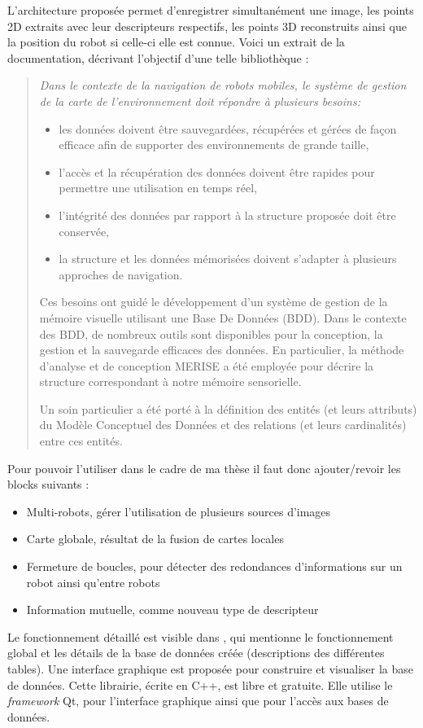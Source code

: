 L'architecture proposée permet d'enregistrer simultanément une image, les points 2D extraits avec leur descripteurs respectifs, les points 3D reconstruits ainsi que la position du robot si celle-ci elle est connue.
Voici un extrait de la documentation, décrivant l'objectif d'une telle bibliothèque :
\begin{quote}
\it Dans le contexte de la navigation de robots mobiles, le système de gestion de la carte de l'environnement doit répondre à plusieurs besoins:
\begin{itemize}
\item les données doivent être sauvegardées, récupérées et gérées de façon efficace afin de supporter des environnements de grande taille,
\item l'accès et la récupération des données doivent être rapides pour permettre une utilisation en temps réel,
\item l'intégrité des données par rapport à la structure proposée doit être conservée,
\item la structure et les données mémorisées doivent s'adapter à plusieurs approches de navigation.
\end{itemize}

Ces besoins ont guidé le développement d'un système de gestion de la mémoire visuelle utilisant une Base De Données (BDD). Dans le contexte des BDD, de nombreux outils sont disponibles pour la conception, la gestion et la sauvegarde efficaces des données. En particulier, la méthode d'analyse et de conception MERISE a été employée pour décrire la structure correspondant à notre mémoire sensorielle.

Un soin particulier a été porté à la définition des entités (et leurs attributs) du Modèle Conceptuel des Données et des relations (et leurs cardinalités) entre ces entités.
\end{quote}

Pour pouvoir l'utiliser dans le cadre de ma thèse il faut donc ajouter/revoir les blocks suivants :
\begin{itemize}
\item Multi-robots, gérer l'utilisation de plusieurs sources d'images
\item Carte globale, résultat de la fusion de cartes locales
\item Fermeture de boucles, pour détecter des redondances d'informations sur un robot ainsi qu'entre robots
\item Information mutuelle, comme nouveau type de descripteur
\end{itemize}


\vspace{5mm}
Le fonctionnement détaillé est visible dans \cite{Lequievre08}, qui mentionne le fonctionnement global et les détails de la base de données créée (descriptions des différentes tables).
Une interface graphique est proposée pour construire et visualiser la base de données.
Cette librairie, écrite en C++, est libre et gratuite.
Elle utilise le \emph{framework} Qt, pour l'interface graphique ainsi que pour l'accès aux bases de données.
